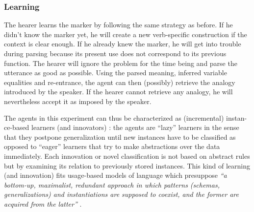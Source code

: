 \subsubsection{Learning}
 The hearer learns the marker by following the same strategy as before. If he didn't know the marker yet, he will create a new verb-specific construction if the context is clear enough. If he already knew the marker, he will get into trouble during parsing because its present use does not correspond to its previous function. The hearer will ignore the problem for the time being and parse the utterance as good as possible. Using the parsed meaning, inferred variable equalities and re-entrance, the agent can then (possibly) retrieve the analogy introduced by the speaker. If the hearer cannot retrieve any analogy, he will nevertheless accept it as imposed by the speaker.

The agents in this experiment can thus be characterized as (incremental) instan-ce-based learners (and innovators) \citep[Chapter 8]{mitchell97machine}: the agents are ``lazy'' learners in the sense that they postpone generalization until new instances have to be classified as opposed to ``eager'' learners that try to make abstractions over the data immediately. Each innovation or novel classification is not based on abstract rules but by examining its relation to previously stored instances.  This kind of learning (and innovation) fits usage-based models of language which presuppose {\em ``a bottom-up, maximalist, redundant approach in which patterns (schemas, generalizations) and instantiations are supposed to coexist, and the former are acquired from the latter''} \citep[20]{daelemans05memory}.


